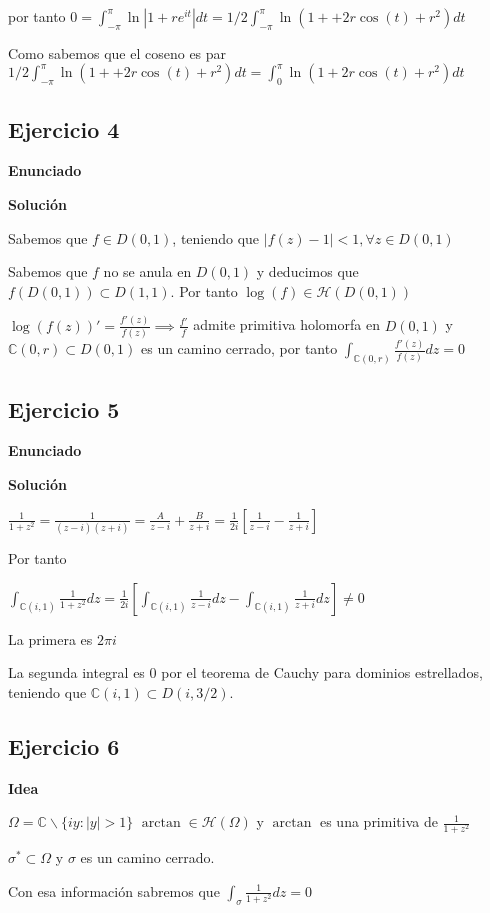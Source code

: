 por tanto
$0 = \int_{-\pi}^{\pi} \ln|1+re^{it}| dt = 1/2 \int_{-\pi}^{\pi} \ln(1++2r\cos(t) +r^2)dt$

Como sabemos que el coseno es par
$ 1/2 \int_{-\pi}^{\pi} \ln(1++2r\cos(t) +r^2)dt = \int_{0}^{\pi} \ln (1+2r\cos(t)+r^2) dt$


\subsection{Ejercicio 4}
\textbf{Enunciado}

\textbf{Solución}

Sabemos que $f\in D(0,1)$, teniendo que $|f(z)-1|<1, \forall z\in D(0,1)$

Sabemos que $f$ no se anula en $D(0,1)$ y deducimos que
$f(D(0,1)) \subset D(1,1)$.
Por tanto $\log(f) \in \mathcal{H}(D(0,1))$

$\log(f(z))' = \frac{f'(z)}{f(z)} \implies \frac{f'}{f}$ admite primitiva holomorfa en $D(0,1)$
y $\mathbb{C}(0,r) \subset D(0,1)$ es un camino cerrado, por tanto
$\int_{\mathbb{C}(0,r)} \frac{f'(z)}{f(z)}dz = 0$



\subsection{Ejercicio 5}
\textbf{Enunciado}

\textbf{Solución}

$\frac{1}{1+z^2} = \frac{1}{(z-i)(z+i)} = \frac{A}{z-i} + \frac{B}{z+i} = \frac{1}{2i} \left[ \frac{1}{z-i} - \frac{1}{z+i} \right]$

Por tanto

$\int_{\mathbb{C}(i,1)} \frac{1}{1+z^2} dz = \frac{1}{2i} \left[ \int_{\mathbb{C}(i,1)}\frac{1}{z-i}dz - \int_{\mathbb{C}(i,1)} \frac{1}{z+i}dz \right] \not = 0$

La primera es $2\pi i$

La segunda integral es $0$ por el teorema de Cauchy para dominios estrellados, teniendo que $\mathbb{C}(i,1) \subset D(i,3/2)$.



\subsection{Ejercicio 6}
\textbf{Idea}

$\Omega = \mathbb{C}\backslash \{ iy : |y|>1 \}$
$\arctan \in \mathcal{H}(\Omega)$ y $\arctan$ es una primitiva de $\frac{1}{1+z^2}$

$\sigma ^{\ast} \subset \Omega$ y $\sigma$ es un camino cerrado.

Con esa información sabremos que 
$\int_{\sigma} \frac{1}{1+z^2} dz = 0$

